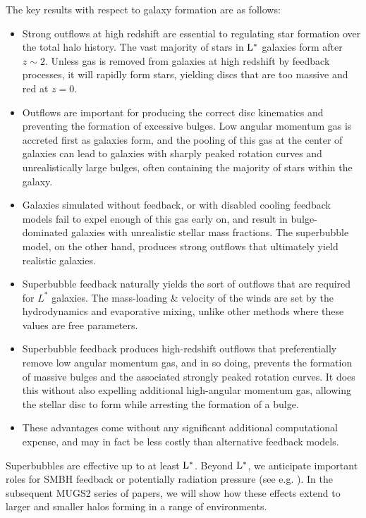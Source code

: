 The key results with respect to galaxy formation are as follows:

\begin{itemize}
    \item Strong outflows at high redshift are essential to regulating
        star formation over the total halo history.  The vast majority of stars
        in $\rm{L^*}$ galaxies form after $z\sim2$.  Unless gas is removed from
        galaxies at high redshift by feedback processes, it will rapidly form
        stars, yielding discs that are too massive and red at $z=0$.
    \item Outflows are important for producing the correct disc kinematics and
        preventing the formation of excessive bulges.  Low angular momentum gas
        is accreted first as galaxies form, and the pooling of this gas at the
        center of galaxies can lead to galaxies with sharply peaked rotation
        curves and unrealistically large bulges, often containing the majority
        of stars within the galaxy.  
    \item Galaxies simulated without feedback, or with disabled cooling feedback
        models fail to expel enough of this gas early on, and result in
        bulge-dominated galaxies with unrealistic stellar mass fractions.  The
        superbubble model, on the other hand, produces strong outflows that
        ultimately yield realistic galaxies.
    \item Superbubble feedback naturally yields the sort of outflows that are
        required for $L^*$ galaxies.  The mass-loading \& velocity of
        the winds are set by the hydrodynamics and evaporative mixing, unlike
        other methods where these values are free parameters.
    \item Superbubble feedback produces high-redshift outflows that
        preferentially remove low angular momentum gas, and in so doing,
        prevents the formation of massive bulges and the associated strongly
        peaked rotation curves. It does this without also expelling additional
        high-angular momentum gas, allowing the stellar disc to form while
        arresting the formation of a bulge.
    \item These advantages come without any significant additional computational
        expense, and may in fact be less costly than alternative feedback
        models.
\end{itemize}

Superbubbles are effective up to at least $\rm{L^*}$.   Beyond $\rm{L^*}$, we
anticipate important roles for SMBH feedback or potentially radiation pressure
(see e.g.  \citealt{Hopkins2013}).  In the subsequent MUGS2 series of papers, we
will show how these effects extend to larger and smaller halos forming in a
range of environments.

